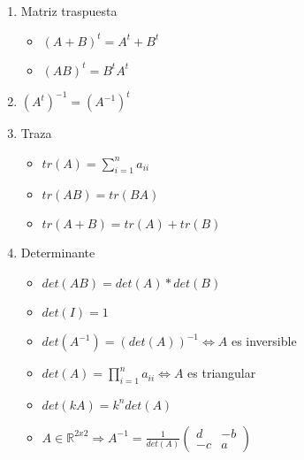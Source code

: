 \begin{enumerate}
\begin{itemize}
    \end{itemize}
    \item Matriz traspuesta
    \begin{itemize}
        \item $(A+B)^t = A^t + B^t$
        \item $(AB)^t = B^tA^t$
    \end{itemize}
    \item $(A^t)^{-1} = (A^{-1})^t$
    \item Traza
    \begin{itemize}
        \item $tr(A) = \sum_{i=1}^{n}a_{ii}$ 
    \item $tr(AB) = tr(BA)$
    \item $tr(A+B) = tr(A)+tr(B)$
    \end{itemize}
    \item Determinante
    \begin{itemize}
        \item $det(AB) = det(A)*det(B)$
        \item $det(I) = 1$
        \item $det(A^{-1}) = (det(A))^{-1} \iff A$ es inversible
        \item $det(A) = \prod_{i=1}^{n}a_{ii} \iff A$ es triangular 
        \item $det(kA) = k^ndet(A)$
        \item $A \in \mathbb{R}^{2x2} \Rightarrow A^{-1} = \frac{1}{det(A)} \begin{pmatrix}
                        d & -b\\
                        -c & a
                        \end{pmatrix}$
    \end{itemize}
\end{enumerate}


